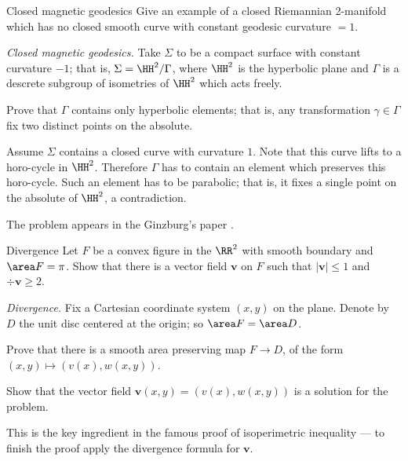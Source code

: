 \begin{pr}{}{Closed magnetic geodesics}\label{twisted-geodesic} %
Give an example of a closed Riemannian 
2-manifold which has no closed smooth curve with constant geodesic curvature $=1$.
\end{pr}

\textit{Closed magnetic geodesics.}
Take $\Sigma$ to be a compact surface with constant curvature $-1$;
that is, 
 $\Sigma=\HH^2/\Gamma$,
where $\HH^2$
is the hyperbolic plane 
and $\Gamma$ is a descrete subgroup of isometries of $\HH^2$ which acts freely.

Prove that $\Gamma$ contains only hyperbolic elements; that is, any transformation $\gamma\in\Gamma$ fix two distinct points on the absolute.

Assume $\Sigma$ contains a closed curve with curvature $1$.
Note that this curve lifts to a horo-cycle in $\HH^2$.
Therefore $\Gamma$ has to contain an element which preserves this horo-cycle.
Such an element has to be parabolic;
that is, it fixes a single point on the absolute of $\HH^2$,
 a contradiction.

The problem appears in the Ginzburg's paper \cite{ginzburg}.












\begin{pr}{}{Divergence}\label{Divergence} %
Let $F$ be a convex figure in the $\RR^2$ with smooth boundary
and $\area F=\pi$.
Show that there is a vector field $\bm{v}$ on $F$
such that $|\bm{v}|\le 1$ and $\div \bm{v}\ge 2$. 
\end{pr}

\textit{Divergence.}
Fix a Cartesian coordinate system $(x,y)$ on the plane.
Denote by $D$ the unit disc centered at the origin;
so $\area F=\area D$.
 
Prove that there is a smooth area preserving map $F\to D$, 
of the form
$(x,y)\mapsto (v(x),w(x,y))$.

Show that the vector field $\bm{v}(x,y)=(v(x),w(x,y))$
is a solution for the problem.

This is the key ingredient in the famous proof of isoperimetric inequality --- to finish the proof apply the divergence formula for $\bm{v}$.

